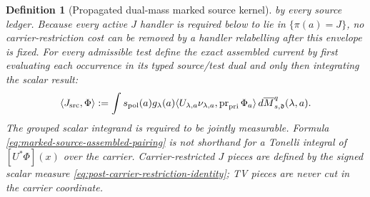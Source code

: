 \documentclass[11pt]{article}
\newtheorem{definition}[theorem]{Definition}
\begin{document}
\begin{definition}[Propagated dual-mass marked source kernel]
by every source ledger.  Because every active $J$ handler is required below
to lie in $\{\pi(a)=J\}$, no carrier-restriction cost can be removed by a
handler relabelling after this envelope is fixed.  For every admissible test define
the exact assembled current by first evaluating each occurrence in its
typed source/test dual and only then integrating the scalar result:
\begin{equation}
\label{eq:marked-source-assembled-pairing}
 \langle J_{\rm src},\Phi\rangle:=
 \int s_{\rm pol}(a)g_\lambda(a)
       \langle U_{\lambda,a}\nu_{\lambda,a},
               \operatorname{pr}_{\rm pri}\Phi_a\rangle
       \,d\overline M_{s,\mathfrak d}^{q}(\lambda,a).
\end{equation}
The grouped scalar integrand is required to be jointly measurable.  Formula
\eqref{eq:marked-source-assembled-pairing} is not shorthand for a Tonelli
integral of $[U^*\Phi](x)$ over the carrier.  Carrier-restricted $J$ pieces
are defined by the signed scalar measure
\eqref{eq:post-carrier-restriction-identity}; TV pieces are never cut in the
carrier coordinate.


\end{definition}
\end{document}
